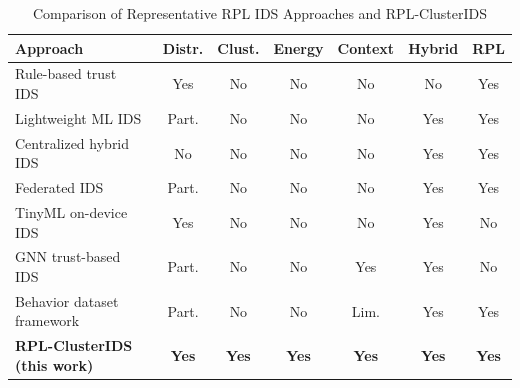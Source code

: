 \begin{table}[!t]
  \caption{Comparison of Representative RPL IDS Approaches and RPL-ClusterIDS}
  \label{tab:related}
  \centering
  \scriptsize
  \setlength{\tabcolsep}{3.5pt}
  \renewcommand{\arraystretch}{1.12}
  \begin{tabular}{@{}lcccccc@{}}
    \toprule
    \textbf{Approach} & \textbf{Distr.} & \textbf{Clust.} & \textbf{Energy} & \textbf{Context} & \textbf{Hybrid} & \textbf{RPL} \\
    \midrule
    Rule-based trust IDS~\cite{raza2017}       & Yes & No  & No  & No  & No  & Yes \\
    Lightweight ML IDS~\cite{hindy2020}        & Part. & No  & No  & No  & Yes & Yes \\
    Centralized hybrid IDS~\cite{garg2023}     & No  & No  & No  & No  & Yes & Yes \\
    Federated IDS~\cite{fldsfa2024}            & Part. & No  & No  & No  & Yes & Yes \\
    TinyML on-device IDS~\cite{sharma2025tinyml}& Yes & No  & No  & No  & Yes & No  \\
    GNN trust-based IDS~\cite{trustawaregnn2025}& Part. & No  & No  & Yes & Yes & No  \\
    Behavior dataset framework~\cite{dib2024}  & Part. & No  & No  & Lim. & Yes & Yes \\
    \textbf{RPL-ClusterIDS (this work)}        & \textbf{Yes} & \textbf{Yes} & \textbf{Yes} & \textbf{Yes} & \textbf{Yes} & \textbf{Yes} \\
    \bottomrule
  \end{tabular}
\end{table}
